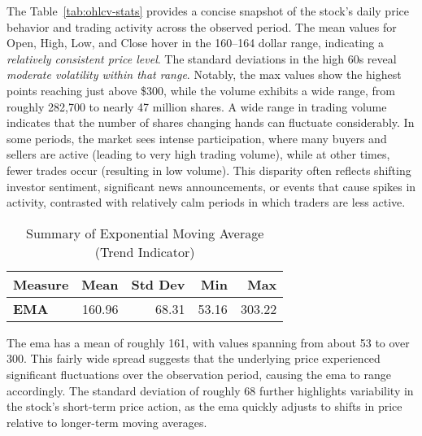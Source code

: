 The Table~\ref{tab:ohlcv-stats} provides a concise snapshot of the stock’s
daily price behavior 
and trading activity across the observed period. The mean values for Open, 
High, Low, and Close hover in the 160–164 dollar range, indicating a 
\emph{relatively consistent price level}. The standard deviations in the high 60s
reveal \emph{moderate volatility within that range}. Notably, the max values 
show the highest points reaching just above \$300, while the volume exhibits a
wide range, from roughly 282,700 to nearly 47 million shares. A wide range in 
trading volume indicates that the number of shares changing hands can fluctuate
considerably. In some periods, the market sees intense participation, where many
buyers and sellers are active (leading to very high trading volume), while at other
times, fewer trades occur (resulting in low volume). This disparity often reflects 
shifting investor sentiment, significant news announcements, or events that cause 
spikes in activity, contrasted with relatively calm periods in which traders are 
less active.

\begin{table}[ht]
\centering
\caption{Summary of Exponential Moving Average (Trend Indicator)}
\label{tab:moving-averages}
\begin{tabular}{lrrrr}
\hline
\textbf{Measure} & \textbf{Mean} & \textbf{Std Dev} & \textbf{Min} & \textbf{Max}\\
\hline\hline
\textbf{EMA} & 160.96 & 68.31 & 53.16 & 303.22 \\
\hline
\end{tabular}
\end{table}

The \acrfull{ema} has a mean of roughly 161, with values spanning from about
53 to over 300. This fairly wide spread suggests that the underlying 
price experienced significant fluctuations over the observation period, causing 
the \acrshort{ema} to range accordingly. The standard deviation of 
roughly 68 further highlights variability in the stock’s short-term price 
action, as the \acrshort{ema} quickly adjusts to shifts in price relative to 
longer-term moving averages.

